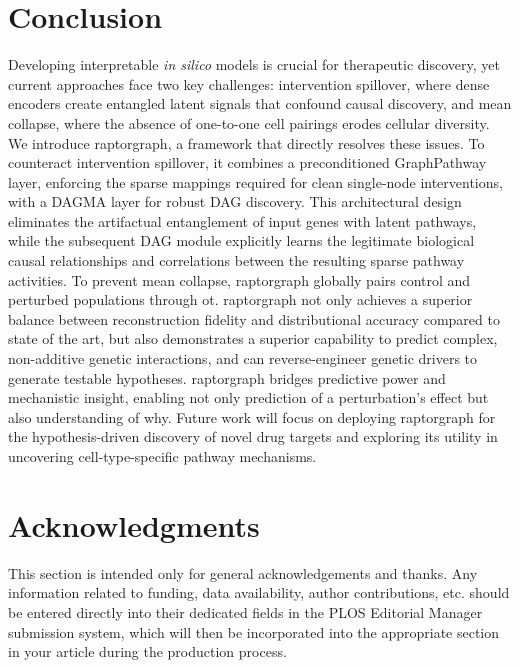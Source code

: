 \documentclass[10pt,letterpaper]{article}
\theoremstyle{definition}
\theoremstyle{remark}
\begin{document}
\section*{Conclusion}
Developing interpretable \emph{in silico} models is crucial for therapeutic discovery, yet current approaches face two key challenges: intervention spillover, where dense encoders create entangled latent signals that confound causal discovery, and mean collapse, where the absence of one-to-one cell pairings erodes cellular diversity. We introduce \gls{raptorgraph}, a framework that directly resolves these issues. To counteract intervention spillover, it combines a preconditioned GraphPathway layer, enforcing the sparse mappings required for clean single-node interventions, with a DAGMA layer for robust DAG discovery.
This architectural design eliminates the artifactual entanglement of input genes with latent pathways, while the subsequent DAG module explicitly learns the legitimate biological causal relationships and correlations between the resulting sparse pathway activities.
To prevent mean collapse, \gls{raptorgraph} globally pairs control and perturbed populations through \gls{ot}.
\gls{raptorgraph} not only achieves a superior balance between reconstruction fidelity and distributional accuracy compared to state of the art, but also demonstrates a superior capability to predict complex, non-additive genetic interactions, and can reverse-engineer genetic drivers to generate testable hypotheses.
\gls{raptorgraph} bridges predictive power and mechanistic insight, enabling not only prediction of a perturbation's effect but also understanding of why.
Future work will focus on deploying \gls{raptorgraph} for the hypothesis-driven discovery of novel drug targets and exploring its utility in uncovering cell-type-specific pathway mechanisms.




\section*{Acknowledgments}
This section is intended only for general acknowledgements and thanks. Any
information related to funding, data availability, author contributions, etc.
should be entered directly into their dedicated fields in the PLOS Editorial
Manager submission system, which will then be incorporated into the appropriate
section in your article during the production process.
\end{document}
